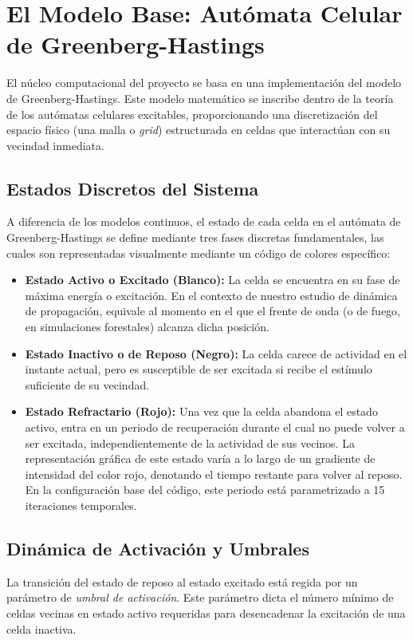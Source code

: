 \documentclass[12pt,a4paper]{article}
\begin{document}
\section{El Modelo Base: Autómata Celular de Greenberg-Hastings}

El núcleo computacional del proyecto se basa en una implementación del modelo de Greenberg-Hastings. Este modelo matemático se inscribe dentro de la teoría de los autómatas celulares excitables, proporcionando una discretización del espacio físico (una malla o \textit{grid}) estructurada en celdas que interactúan con su vecindad inmediata.

\subsection{Estados Discretos del Sistema}
A diferencia de los modelos continuos, el estado de cada celda en el autómata de Greenberg-Hastings se define mediante tres fases discretas fundamentales, las cuales son representadas visualmente mediante un código de colores específico:

\begin{itemize}
    \item \textbf{Estado Activo o Excitado (Blanco):} La celda se encuentra en su fase de máxima energía o excitación. En el contexto de nuestro estudio de dinámica de propagación, equivale al momento en el que el frente de onda (o de fuego, en simulaciones forestales) alcanza dicha posición.
    \item \textbf{Estado Inactivo o de Reposo (Negro):} La celda carece de actividad en el instante actual, pero es susceptible de ser excitada si recibe el estímulo suficiente de su vecindad.
    \item \textbf{Estado Refractario (Rojo):} Una vez que la celda abandona el estado activo, entra en un periodo de recuperación durante el cual no puede volver a ser excitada, independientemente de la actividad de sus vecinos. La representación gráfica de este estado varía a lo largo de un gradiente de intensidad del color rojo, denotando el tiempo restante para volver al reposo. En la configuración base del código, este periodo está parametrizado a 15 iteraciones temporales.
\end{itemize}

\subsection{Dinámica de Activación y Umbrales}
La transición del estado de reposo al estado excitado está regida por un parámetro de \textit{umbral de activación}. Este parámetro dicta el número mínimo de celdas vecinas en estado activo requeridas para desencadenar la excitación de una celda inactiva. 
\end{document}
